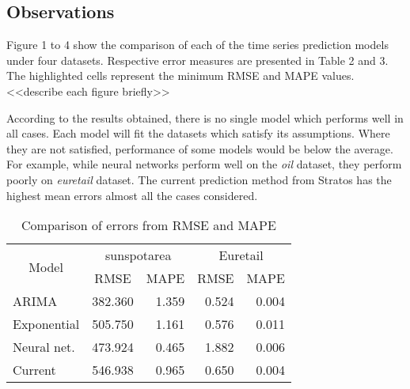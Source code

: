 \subsection{Observations}

Figure 1 to 4 show the comparison of each of the time series prediction models under four datasets. Respective error measures are presented in Table 2 and 3. The highlighted cells represent the minimum RMSE and MAPE values. 
<<describe each figure briefly>>

According to the results obtained, there is no single model which performs well in all cases. Each model will fit the datasets which satisfy its assumptions. Where they are not satisfied, performance of some models would be below the average. For example, while neural networks perform well on the \textit{oil} dataset, they perform poorly on \textit{euretail} dataset. The current prediction method from Stratos has the highest mean errors almost all the cases considered.

\begin{table}[]
\centering
\caption{Comparison of errors from RMSE and MAPE}
\begin{tabular}{|l|l|r|r|r|}
\hline
\multicolumn{1}{|c|}{\multirow{2}{*}{Model}} & \multicolumn{2}{c|}{sunspotarea}                     & \multicolumn{2}{c|}{Euretail}                        \\ \cline{2-5}
\multicolumn{1}{|c|}{}                       & \multicolumn{1}{c|}{RMSE} & \multicolumn{1}{c|}{MAPE} & \multicolumn{1}{c|}{RMSE} & \multicolumn{1}{c|}{MAPE} \\ \hline
ARIMA                                        & 382.360                & 1.359                   & 0.524                  & 0.004                   \\ \hline
Exponential                                  & 505.750                & 1.161                   & 0.576                  & 0.011                   \\ \hline
Neural net.                                  & 473.924                & 0.465                   & 1.882                  & 0.006                   \\ \hline
Current                                      & 546.938                & 0.965                   & 0.650                  & 0.004                   \\ \hline
\end{tabular}
\end{table}

